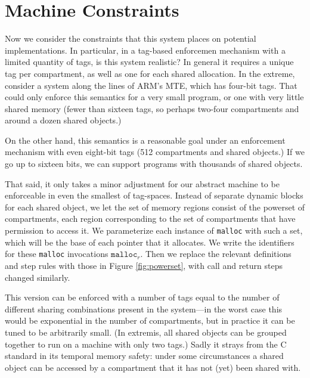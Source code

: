 \documentclass{article}
\begin{document}
\section{Machine Constraints}

Now we consider the constraints that this system places on potential implementations.
In particular, in a tag-based enforcemen mechanism with a limited quantity of tags,
is this system realistic? In general it requires a unique tag per compartment,
as well as one for each shared allocation. In the extreme, consider a system along
the lines of ARM's MTE, which has four-bit tags. That could only enforce this
semantics for a very small program, or one with very little shared memory
(fewer than sixteen tags, so perhaps two-four compartments and around a dozen shared objects.)

On the other hand, this semantics is a reasonable goal under an enforcement mechanism
with even eight-bit tags (512 compartments and shared objects.) If we go up to sixteen
bits, we can support programs with thousands of shared objects.

That said, it only takes a minor adjustment for our abstract machine to be enforceable in even
the smallest of tag-spaces. Instead of separate dynamic blocks for each shared
object, we let the set of memory regions consist of the powerset of compartments,
each region corresponding to the set of compartments that have permission to access it.
We parameterize each instance of {\tt malloc}
with such a set, which will be the base of each pointer that it allocates. We write
the identifiers for these {\tt malloc} invocations \(\mathtt{malloc}_r\).
Then we replace the relevant definitions and step rules with those in
Figure \ref{fig:powerset}, with call and return steps changed similarly.

This version can be enforced with a number of tags equal to the number of different
sharing combinations present in the system---in the worst case this would be
exponential in the number of compartments, but in practice it can be tuned to be
arbitrarily small. (In extremis, all shared objects can be grouped together to run
on a machine with only two tags.) Sadly it strays from the C standard in its
temporal memory safety: under some circumstances a shared object can be accessed
by a compartment that it has not (yet) been shared with.

\end{document}
